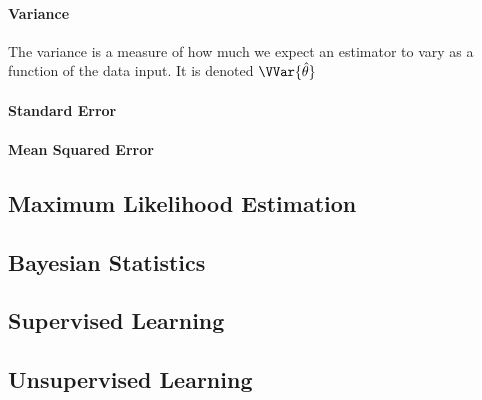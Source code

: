         \paragraph{Variance}
        The variance is a measure of how much we expect an estimator to vary as a function of the data input. It is denoted $\VVar{\hat{\theta}}$


        \paragraph{Standard Error}

        \paragraph{Mean Squared Error}


    \subsection{Maximum Likelihood Estimation}
    \subsection{Bayesian Statistics}
    \subsection{Supervised Learning}
    \subsection{Unsupervised Learning}
